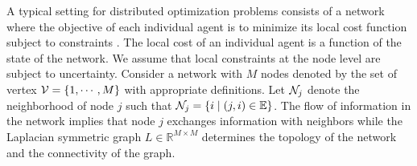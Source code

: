 \documentclass[journal,twoside,web]{ieeecolor}
\newtheorem{assumption}[theorem]{Assumption}
\begin{document}
A typical setting for distributed optimization problems consists of a network where the objective of each individual agent is to minimize its local cost function subject to constraints \cite{nedic2009,lobel2011,duchi2012,ram2010,zhu2010,wang2011,elia2010}. The local cost of an individual agent is a function of the state of the network. We assume that local constraints at the node level are subject to uncertainty. Consider a network with $M$ nodes denoted by the set of vertex ${\cal V}=\{1,\cdots,M\}$ with appropriate definitions. 
Let ${\cal N}_j$ denote the neighborhood of node $j$ such that ${\cal N}_j=\{i\;|\;(j,i)\in {\mathbb E}\}$. The flow of information in the network implies that node $j$ exchanges information with neighbors while the Laplacian symmetric graph $L \in \mathbb{R}^{M \times M}$ determines the topology of the network and the connectivity of the graph.
\end{document}
